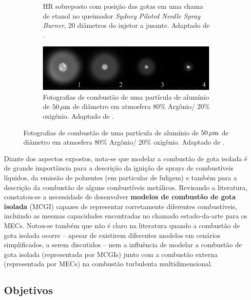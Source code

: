 \begin{figure}[H]
\begin{subfigure}[t]{0.48\textwidth}
        \vfill
        \caption{HR sobreposto com posição das gotas em uma chama de etanol no queimador \emph{Sydney Piloted Needle Spray Burner}, 20 diâmetros do injetor a jusante. Adaptado de \cite[Fig. 10]{SinghG2020}.}
        \label{fig:SinghG2020-10}
    \end{subfigure}
    \vspace{0.5cm}
    \begin{subfigure}[b]{0.8\textwidth}
        \centering
        \includegraphics[width=0.99\textwidth]{30_images/Braconnier202PhD-5.20.png}
        \caption{Fotografias de combustão de uma partícula de alumínio de $50 \, \mathrm{\mu m}$ de diâmetro em atmosfera 80\% Argônio/ 20\% oxigênio. Adaptado de \cite[Fig. 5.21]{Braconnier2022}.}
        \label{fig:Braconnier202PhD-5.20}
    \end{subfigure}
    \label{fig:sdc-exp}
\end{figure}
\vspace{-24pt}

Diante dos aspectos expostos, nota-se que modelar a combustão de gota isolada é de grande importância para a descrição da ignição de sprays de combustíveis líquidos, da emissão de poluentes (em particular de fuligem) e também para a descrição da combustão de alguns combustíveis metálicos. 
Revisando a literatura, constatou-se a necessidade de desenvolver \textbf{modelos de combustão de gota isolada} (MCGI) capazes de representar corretamente diferentes combustíveis, incluindo as mesmas capacidades encontradas no chamado estado-da-arte para os MECs.
Notou-se também que não é claro na literatura quando a combustão de gota isolada ocorre \cite[p. 8]{JennyB2012} -- apesar de existirem diferentes modelos em cenários simplificados, a serem discutidos -- nem a influência de modelar a combustão de gota isolada (representada por MCGIs) junto com a combustão externa (representada por MECs) na combustão turbulenta multidimensional.


\subsection{Objetivos} \label{sec:objetivos}

